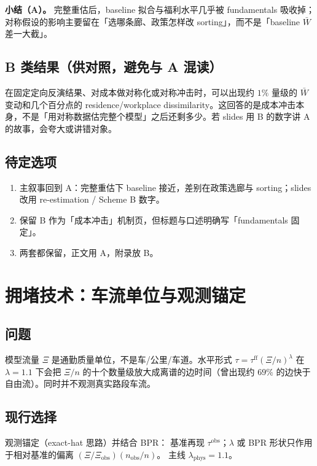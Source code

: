\documentclass[11pt,a4paper]{article}
\begin{document}
\textbf{小结（A）。} 完整重估后，baseline 拟合与福利水平几乎被 fundamentals 吸收掉；对称假设的影响主要留在「选哪条廊、政策怎样改 sorting」，而不是「baseline $\bar W$ 差一大截」。

\subsection*{B 类结果（供对照，避免与 A 混读）}
在固定定向反演结果、对成本做对称化或对称冲击时，可以出现约 $1\%$ 量级的 $\bar W$ 变动和几个百分点的 residence/workplace dissimilarity。这回答的是成本冲击本身，不是「用对称数据估完整个模型」之后还剩多少。若 slides 用 B 的数字讲 A 的故事，会夸大或讲错对象。

\subsection*{待定选项}
\begin{enumerate}[nosep]
  \item 主叙事回到 A：完整重估下 baseline 接近，差别在政策选廊与 sorting；slides 改用 re-estimation / Scheme B 数字。
  \item 保留 B 作为「成本冲击」机制页，但标题与口述明确写「fundamentals 固定」。
  \item 两套都保留，正文用 A，附录放 B。
\end{enumerate}

\section{拥堵技术：车流单位与观测锚定}
\label{sec:anchor}

\subsection*{问题}
模型流量 $\Xi$ 是通勤质量单位，不是车/公里/车道。水平形式 $\tau=\tau^{\mathrm{ff}}(\Xi/n)^{\lambda}$ 在 $\lambda=1.1$ 下会把 $\Xi/n$ 的十个数量级放大成离谱的边时间（曾出现约 $69\%$ 的边快于自由流）。同时并不观测真实路段车流。

\subsection*{现行选择}
观测锚定（exact-hat 思路）并结合 BPR：
基准再现 $\tau^{\mathrm{obs}}$；$\lambda$ 或 BPR 形状只作用于相对基准的偏离
$(\Xi/\Xi_{\mathrm{obs}})(n_{\mathrm{obs}}/n)$。
主线 $\lambda_{\mathrm{phys}}=1.1$。
\end{document}
